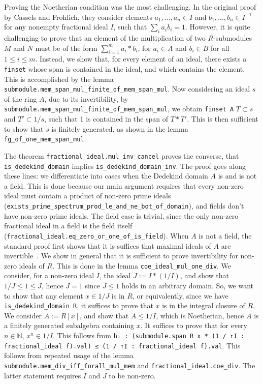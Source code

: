 \documentclass[a4paper,USenglish,cleveref, autoref, thm-restate]{lipics-v2021}
\newcommand{\lean}[1]{\texttt{#1}\xspace} %
\begin{document}
Proving the Noetherian condition was the most challenging.
In the original proof by Cassels and Frohlich, they consider elements $a_1, \dots, a_n \in I$ and $b_1, \dots, b_n \in I^{-1}$ for any nonempty fractional ideal $I$,
such that $ \sum_i a_i b_i = 1 $.
However, it is quite challenging to prove that an element of the multiplication of two $R$-submodules $M$ and $N$ must be of the form $\sum_{i = 1}^m a_i*b_i$, for $a_i \in A$ and $b_i \in B$ for all $1 \leq i \leq m$.
Instead, we show that, for every element of an ideal, there exists a \lean{finset} whose span is contained in the ideal, and which contains the element.
This is accomplished by the lemma \lean{submodule.mem\_span\_mul\_finite\_of\_mem\_span\_mul}.
Now considering an ideal $s$ of the ring $A$, due to its invertibility, by \lean{submodule.mem\_span\_mul\_finite\_of\_mem\_span\_mul}, we obtain \lean{finset A} $T \subset s$ and $T' \subset 1/s$, such that 1 is contained in the span of $T*T'$.
This is then sufficient to show that $s$ is finitely generated, as shown in the lemma \lean{fg\_of\_one\_mem\_span\_mul}.

The theorem \lean{fractional\_ideal.mul\_inv\_cancel} proves the converse, that \lean{is\_dedekind\_domain} implies \lean{is\_dedekind\_domain\_inv}.
The proof goes along these lines: we differentiate into cases when the Dedekind domain $A$ is and is not a field.
This is done because our main argument requires that every non-zero ideal must contain a product of non-zero prime ideals (\lean{exists\_prime\_spectrum\_prod\_le\_and\_ne\_bot\_of\_domain}),
and fields don't have non-zero prime ideals.
The field case is trivial, since the only non-zero fractional ideal in a field is the field itself (\lean{fractional\_ideal.eq\_zero\_or\_one\_of\_is\_field}).
When $A$ is not a field, the standard proof first shows that it is suffices that maximal ideals of $A$ are invertible~\cite[Proposition 3.8]{Neukirch}.
We show in general that it is sufficient to prove invertibility for non-zero ideals of $R$.
This is done in the lemma \lean{coe\_ideal\_mul\_one\_div}.
We consider, for a non-zero ideal $I$, the ideal $J := I * (1/I)$, and show that $1/J \leq 1 \le J$, hence $J = 1$ since $J \le 1$ holds in an arbitrary domain. So, we want to show that any element $x \in 1/J$ is in $R$, or equivalently, since we have \lean{is\_dedekind\_domain R}, it suffices to prove that $x$ is in the integral closure of $R$. We consider $A := R[x]$, and show that $A \leq 1/I$, which is Noetherian, hence $A$ is a finitely generated subalgebra containing $x$. It suffices to prove that for every $n \in \mathbb{N}$, $x^n \in 1/I$. This follows from \lean{h₁ : (submodule.span R {x} * (1 / ↑I : fractional_ideal f).val) ≤
      (1 / ↑I : fractional_ideal f).val}. This follows from repeated usage of the lemma \lean{submodule.mem\_div\_iff\_forall\_mul\_mem} and \lean{fractional\_ideal.coe\_div}. The latter statement requires $I$ and $J$ to be non-zero. 
\end{document}
